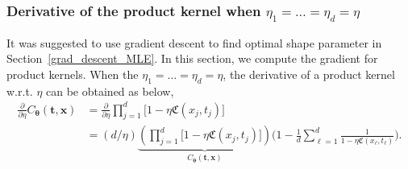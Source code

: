 \documentclass{svjour3}                     %
\newcommand{\bm}[1]{\boldsymbol{#1}}
\newcommand{\vtheta}{{\bm{\theta}}}
\newcommand{\vt}{\bm{t}}
\newcommand{\vx}{\bm{x}}
\newcommand\secref{Section~\ref}
\begin{document}
\subsubsection{Derivative of the product kernel when $\eta_1=\dots=\eta_d=\eta$}
\label{sec:deriv_of_kernel}
It was suggested to use gradient descent to find optimal shape parameter in \secref{grad_descent_MLE}. In this section, we compute the gradient for product kernels. When the $\eta_1=\dots=\eta_d=\eta$, the derivative of a product kernel  w.r.t. $\eta$ can be obtained as below,
\begin{align*}
\frac{\partial}{\partial \eta} C_\vtheta(\vt, \vx) 
& =
\frac{\partial}{\partial \eta} 
\prod_{j=1}^d \biggl[
1 - \eta \mathfrak{C}(x_j,t_j) \biggr] %
\\
& =
({d}/{\eta} )
\underbrace{
	\left(
	\prod_{j=1}^d \biggl[
	1 - \eta \mathfrak{C}(x_j,t_j) \biggr]
	\right) }_
{ C_\vtheta(\vt, \vx) }
\biggl(
1 - 
\frac{1}{d} \sum_{\ell=1}^d
\frac{1}
{ 1 - \eta \mathfrak{C}(x_\ell,t_\ell) }
\biggr)
.
\end{align*}

\end{document}
